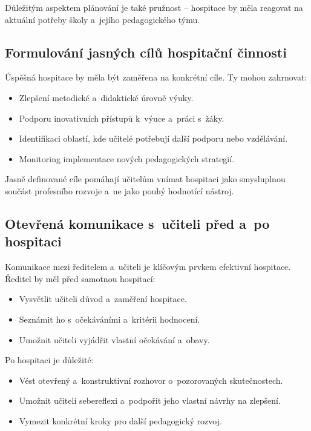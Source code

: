 Důležitým aspektem plánování je také pružnost – hospitace by měla reagovat na aktuální potřeby školy a~jejího pedagogického týmu.

\subsection{Formulování jasných cílů hospitační činnosti}
Úspěšná hospitace by měla být zaměřena na konkrétní cíle. Ty mohou zahrnovat:

\begin{itemize}
    \item Zlepšení metodické a~didaktické úrovně výuky.
    \item Podporu inovativních přístupů k~výuce a~práci s~žáky.
    \item Identifikaci oblastí, kde učitelé potřebují další podporu nebo vzdělávání.
    \item Monitoring implementace nových pedagogických strategií.
\end{itemize}

Jasně definované cíle pomáhají učitelům vnímat hospitaci jako smysluplnou součást profesního rozvoje a~ne jako pouhý hodnotící nástroj.

\subsection{Otevřená komunikace s~učiteli před a~po hospitaci}
Komunikace mezi ředitelem a~učiteli je klíčovým prvkem efektivní hospitace. Ředitel by měl před samotnou hospitací:

\begin{itemize}
    \item Vysvětlit učiteli důvod a~zaměření hospitace.
    \item Seznámit ho s~očekáváními a~kritérii hodnocení.
    \item Umožnit učiteli vyjádřit vlastní očekávání a~obavy.
\end{itemize}

Po hospitaci je důležité:

\begin{itemize}
    \item Vést otevřený a~konstruktivní rozhovor o~pozorovaných skutečnostech.
    \item Umožnit učiteli sebereflexi a~podpořit jeho vlastní návrhy na zlepšení.
    \item Vymezit konkrétní kroky pro další pedagogický rozvoj.
\end{itemize}

